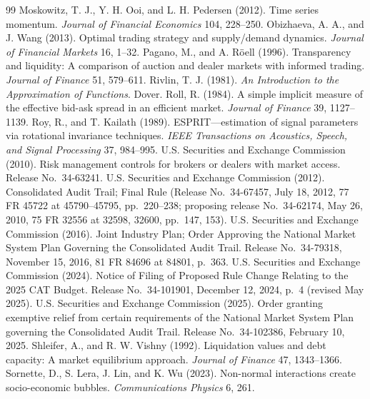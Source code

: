 \begin{thebibliography}{99}
 Moskowitz, T. J., Y. H. Ooi, and L. H. Pedersen (2012). Time series momentum. \emph{Journal of Financial Economics} 104, 228--250.
 Obizhaeva, A. A., and J. Wang (2013). Optimal trading strategy and supply/demand dynamics. \emph{Journal of Financial Markets} 16, 1--32.
 Pagano, M., and A. R\"oell (1996). Transparency and liquidity: A comparison of auction and dealer markets with informed trading. \emph{Journal of Finance} 51, 579--611.
 Rivlin, T. J. (1981). \emph{An Introduction to the Approximation of Functions}. Dover.
 Roll, R. (1984). A simple implicit measure of the effective bid-ask spread in an efficient market. \emph{Journal of Finance} 39, 1127--1139.
 Roy, R., and T. Kailath (1989). ESPRIT---estimation of signal parameters via rotational invariance techniques. \emph{IEEE Transactions on Acoustics, Speech, and Signal Processing} 37, 984--995.
 U.S. Securities and Exchange Commission (2010). Risk management controls for brokers or dealers with market access. Release No.\ 34-63241.
 U.S. Securities and Exchange Commission (2012). Consolidated Audit Trail; Final Rule (Release No.\ 34-67457, July 18, 2012, 77 FR 45722 at 45790--45795, pp.\ 220--238; proposing release No.\ 34-62174, May 26, 2010, 75 FR 32556 at 32598, 32600, pp.\ 147, 153).
 U.S. Securities and Exchange Commission (2016). Joint Industry Plan; Order Approving the National Market System Plan Governing the Consolidated Audit Trail. Release No.\ 34-79318, November 15, 2016, 81 FR 84696 at 84801, p.\ 363.
 U.S. Securities and Exchange Commission (2024). Notice of Filing of Proposed Rule Change Relating to the 2025 CAT Budget. Release No.\ 34-101901, December 12, 2024, p.\ 4 (revised May 2025).
 U.S. Securities and Exchange Commission (2025). Order granting exemptive relief from certain requirements of the National Market System Plan governing the Consolidated Audit Trail. Release No.\ 34-102386, February 10, 2025.
 Shleifer, A., and R. W. Vishny (1992). Liquidation values and debt capacity: A market equilibrium approach. \emph{Journal of Finance} 47, 1343--1366.
 Sornette, D., S. Lera, J. Lin, and K. Wu (2023). Non-normal interactions create socio-economic bubbles. \emph{Communications Physics} 6, 261.

\end{thebibliography}
